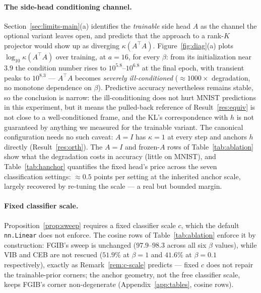 \documentclass{article} %
\begin{document}
\paragraph{The side-head conditioning channel.}
Section~\ref{sec:limits-main}(a) identifies the \emph{trainable} side head $A$ as the
channel the optional variant leaves open, and predicts that the approach to a rank-$K$
projector would show
up as diverging $\kappa(A^{\top}A)$. Figure~\ref{fig:diag}(a) plots
$\log_{10}\kappa(A^{\top}A)$ over training, at $a=16$, for every $\beta$: from its
initialization near $3.9$ the condition number rises to $10^{5.8}$--$10^{6.8}$ at
the final epoch, with transient peaks to $10^{8.3}$ --- $A^{\top}A$ becomes
\emph{severely ill-conditioned} ($\approx 1000\times$ degradation, no monotone
dependence on $\beta$). Predictive accuracy nevertheless remains stable, so the
conclusion is narrow: the ill-conditioning does not hurt MNIST predictions in this
experiment, but it means the pulled-back reference of Result~\ref{res:equiv} is not
close to a well-conditioned frame, and the KL's correspondence with $h$ is not
guaranteed by anything we measured for the trainable variant. The canonical
configuration needs no such caveat: $A=I$ has $\kappa = 1$ at every step and anchors
$h$ directly (Result~\ref{res:orth}). The $A{=}I$ and frozen-$A$ rows of
Table~\ref{tab:ablation} show what the degradation costs in accuracy (little on
MNIST), and Table~\ref{tab:hanchor} quantifies the fixed head's price across the seven
classification settings: $\approx 0.5$ points per setting at the inherited anchor
scale, largely recovered by re-tuning the scale --- a real but bounded margin.

\paragraph{Fixed classifier scale.}
Proposition~\ref{prop:sweep} requires a fixed classifier scale $c$, which the default
\texttt{nn.Linear} does not enforce. The cosine rows of Table~\ref{tab:ablation}
enforce it by construction: FGIB's sweep is unchanged ($97.9$--$98.3$ across all six
$\beta$ values), while VIB and CEB are not rescued ($51.9\%$ at $\beta=1$ and $41.6\%$
at $\beta=0.1$ respectively), exactly as Remark~\ref{rem:c-scale} predicts --- fixed
$c$ does not repair the trainable-prior corners; the anchor geometry, not the free
classifier scale, keeps FGIB's corner non-degenerate (Appendix~\ref{app:tables},
cosine rows).
\end{document}
